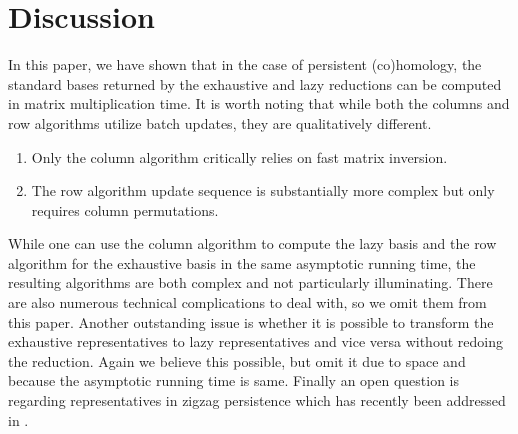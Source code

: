 \documentclass{article}
\begin{document}
\section{Discussion}
In this paper, we have shown that in the  case of persistent (co)homology, the standard bases returned by the exhaustive and lazy reductions can be computed in matrix multiplication time. It is worth noting that while both the columns and row algorithms utilize batch updates, they are qualitatively different.
%
\begin{enumerate}
\item Only the column algorithm critically relies  on fast  matrix inversion.%
\item The row algorithm update sequence is substantially more complex %
but only requires column permutations. 
\end{enumerate}
%
While one can use the column algorithm to compute the lazy basis and the row algorithm for the exhaustive basis in the same asymptotic running time, the resulting algorithms are both complex and not particularly illuminating. There are also numerous technical complications to deal with, so we omit them from this paper. Another outstanding issue is whether it is possible to transform the exhaustive representatives to lazy representatives and vice versa without redoing the reduction. Again we believe this possible, but omit it due to space and because the asymptotic running time is same. Finally an open question is regarding representatives in zigzag persistence which has  recently been addressed in \cite{dey2021updating,dey2024fast}.


\end{document}
